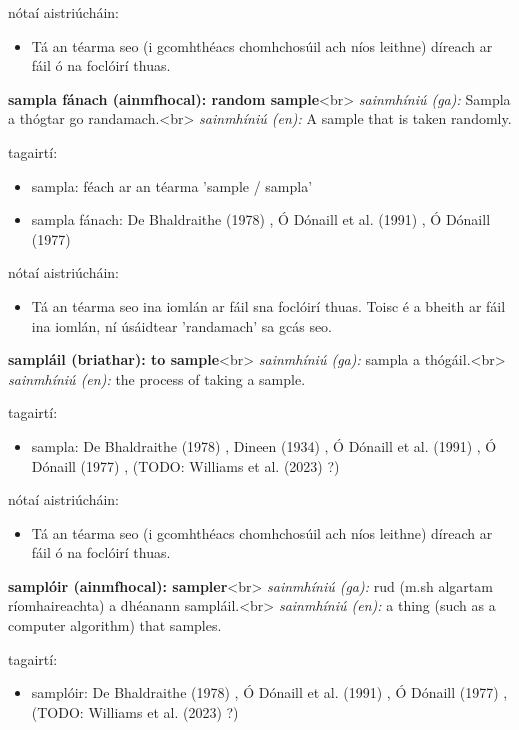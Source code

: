 \documentclass{article}
\begin{document}
nótaí aistriúcháin:
\begin{itemize}
	\item Tá an téarma seo (i gcomhthéacs chomhchosúil ach níos leithne) díreach ar fáil ó na foclóirí thuas.
\end{itemize}


\textbf{sampla fánach (ainmfhocal): random sample}<br>
\textit{sainmhíniú (ga):} Sampla a thógtar go randamach.<br>
\textit{sainmhíniú (en):} A sample that is taken randomly.

tagairtí:
\begin{itemize}
	\item sampla: féach ar an téarma 'sample / sampla'
	\item sampla fánach: De Bhaldraithe (1978) \cite{de-bhaldraithe}, Ó Dónaill et al. (1991) \cite{focloir-beag}, Ó Dónaill (1977) \cite{odonaill}
\end{itemize}

nótaí aistriúcháin:
\begin{itemize}
	\item Tá an téarma seo ina iomlán ar fáil sna foclóirí thuas. Toisc é a bheith ar fáil ina iomlán, ní úsáidtear 'randamach' sa gcás seo.
\end{itemize}


\textbf{sampláil (briathar): to sample}<br>
\textit{sainmhíniú (ga):} sampla a thógáil.<br>
\textit{sainmhíniú (en):} the process of taking a sample.

tagairtí:
\begin{itemize}
	\item sampla: De Bhaldraithe (1978) \cite{de-bhaldraithe}, Dineen (1934) \cite{dineen}, Ó Dónaill et al. (1991) \cite{focloir-beag}, Ó Dónaill (1977) \cite{odonaill}, (TODO: Williams et al. (2023) \cite{storchiste}?)
\end{itemize}

nótaí aistriúcháin:
\begin{itemize}
	\item Tá an téarma seo (i gcomhthéacs chomhchosúil ach níos leithne) díreach ar fáil ó na foclóirí thuas.
\end{itemize}


\textbf{samplóir (ainmfhocal): sampler}<br>
\textit{sainmhíniú (ga):} rud (m.sh algartam ríomhaireachta) a dhéanann sampláil.<br>
\textit{sainmhíniú (en):} a thing (such as a computer algorithm) that samples.

tagairtí:
\begin{itemize}
	\item samplóir: De Bhaldraithe (1978) \cite{de-bhaldraithe}, Ó Dónaill et al. (1991) \cite{focloir-beag}, Ó Dónaill (1977) \cite{odonaill}, (TODO: Williams et al. (2023) \cite{storchiste}?)
\end{itemize}
\end{document}
